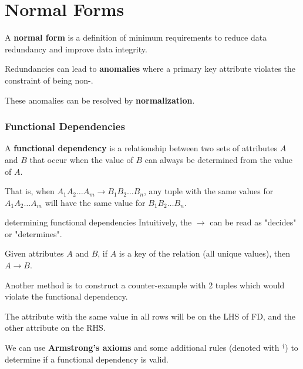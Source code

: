 \part{Normal Forms}
A \textbf{normal form} is a definition of minimum requirements to reduce data redundancy and improve data integrity.

Redundancies can lead to \textbf{anomalies} where a primary key attribute violates the constraint of being non-.

These anomalies can be resolved by \textbf{normalization}.


\section{Functional Dependencies}
A \textbf{functional dependency} is a relationship between two sets of attributes $A$ and $B$ that occur when the value of $B$ can always be determined from the value of $A$.

That is, when $A_1 A_2 \dots A_m \rightarrow B_1 B_2 \dots B_n$, any tuple with the same values for $A_1 A_2 \dots A_m$ will have the same value for $B_1 B_2 \dots B_n$.

\begin{defn}{determining functional dependencies}
    Intuitively, the $\rightarrow$ can be read as "decides" or "determines".

    Given attributes $A$ and $B$, if $A$ is a key of the relation (all unique values), then $A \rightarrow B$.

    Another method is to construct a counter-example with 2 tuples which would violate the functional dependency.

    The attribute with the same value in all rows will be on the LHS of FD, and the other attribute on the RHS.
\end{defn}

We can use \textbf{Armstrong's axioms} and some additional rules (denoted with $^\dagger$) to determine if a functional dependency is valid.

\begin{itemize}
\end{itemize}

